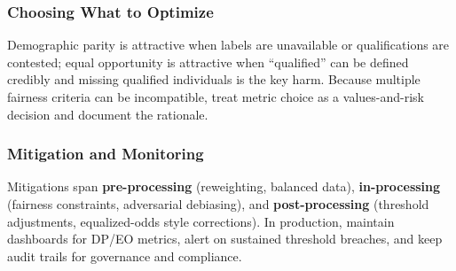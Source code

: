 \begin{TNtwocol}
\subsubsection*{Choosing What to Optimize}
Demographic parity is attractive when labels are unavailable or qualifications are contested; equal opportunity is attractive when ``qualified'' can be defined credibly and missing qualified individuals is the key harm. Because multiple fairness criteria can be incompatible, treat metric choice as a values-and-risk decision and document the rationale.

\subsubsection*{Mitigation and Monitoring}
Mitigations span \textbf{pre-processing} (reweighting, balanced data), \textbf{in-processing} (fairness constraints, adversarial debiasing), and \textbf{post-processing} (threshold adjustments, equalized-odds style corrections). In production, maintain dashboards for DP/EO metrics, alert on sustained threshold breaches, and keep audit trails for governance and compliance.



\end{TNtwocol}